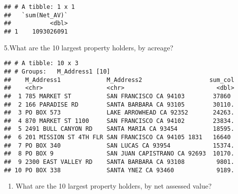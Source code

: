 \documentclass[]{article}
\newenvironment{Shaded}{\begin{snugshade}}{\end{snugshade}}
\newcommand{\KeywordTok}[1]{\textcolor[rgb]{0.13,0.29,0.53}{\textbf{#1}}}
\newcommand{\DataTypeTok}[1]{\textcolor[rgb]{0.13,0.29,0.53}{#1}}
\newcommand{\DecValTok}[1]{\textcolor[rgb]{0.00,0.00,0.81}{#1}}
\newcommand{\StringTok}[1]{\textcolor[rgb]{0.31,0.60,0.02}{#1}}
\newcommand{\CommentTok}[1]{\textcolor[rgb]{0.56,0.35,0.01}{\textit{#1}}}
\newcommand{\OperatorTok}[1]{\textcolor[rgb]{0.81,0.36,0.00}{\textbf{#1}}}
\newcommand{\NormalTok}[1]{#1}
\providecommand{\tightlist}{%
  \setlength{\itemsep}{0pt}\setlength{\parskip}{0pt}}
\begin{document}
\begin{verbatim}
## # A tibble: 1 x 1
##   `sum(Net_AV)`
##           <dbl>
## 1    1093026091
\end{verbatim}

5.What are the 10 largest property holders, by acreage?

\begin{Shaded}
\end{Shaded}

\begin{verbatim}
## # A tibble: 10 x 3
## # Groups:   M_Address1 [10]
##    M_Address1             M_Address2                   sum_col
##    <chr>                  <chr>                          <dbl>
##  1 785 MARKET ST          SAN FRANCISCO CA 94103        37860 
##  2 166 PARADISE RD        SANTA BARBARA CA 93105        30110.
##  3 PO BOX 573             LAKE ARROWHEAD CA 92352       24263.
##  4 870 MARKET ST 1100     SAN FRANCISCO CA 94102        23834.
##  5 2491 BULL CANYON RD    SANTA MARIA CA 93454          18595.
##  6 201 MISSION ST 4TH FLR SAN FRANCISCO CA 94105 1831   16640 
##  7 PO BOX 340             SAN LUCAS CA 93954            15374.
##  8 PO BOX 9               SAN JUAN CAPISTRANO CA 92693  10170.
##  9 2300 EAST VALLEY RD    SANTA BARBARA CA 93108         9801.
## 10 PO BOX 338             SANTA YNEZ CA 93460            9189.
\end{verbatim}

\begin{enumerate}
\def\labelenumi{\arabic{enumi}.}
\setcounter{enumi}{5}
\tightlist
\item
  What are the 10 largest property holders, by net assessed value?
\end{enumerate}
\end{document}
